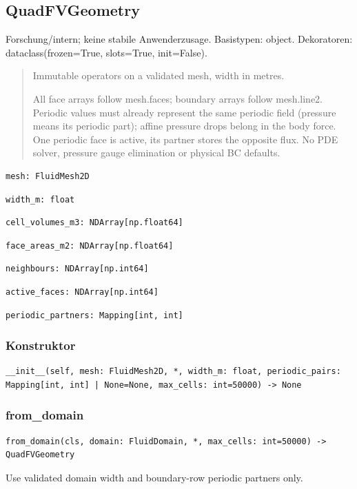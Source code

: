 \subsection{QuadFVGeometry}
Forschung/intern; keine stabile Anwenderzusage.
Basistypen: object. Dekoratoren: dataclass(frozen=True, slots=True, init=False).
\begin{quote}
Immutable operators on a validated mesh, width in metres.\par All face arrays follow mesh.faces; boundary arrays follow mesh.line2. Periodic values must already represent the same periodic field (pressure means its periodic part); affine pressure drops belong in the body force. One periodic face is active, its partner stores the opposite flux. No PDE solver, pressure gauge elimination or physical BC defaults.
\end{quote}
\begin{lstlisting}
mesh: FluidMesh2D
\end{lstlisting}
\begin{lstlisting}
width_m: float
\end{lstlisting}
\begin{lstlisting}
cell_volumes_m3: NDArray[np.float64]
\end{lstlisting}
\begin{lstlisting}
face_areas_m2: NDArray[np.float64]
\end{lstlisting}
\begin{lstlisting}
neighbours: NDArray[np.int64]
\end{lstlisting}
\begin{lstlisting}
active_faces: NDArray[np.int64]
\end{lstlisting}
\begin{lstlisting}
periodic_partners: Mapping[int, int]
\end{lstlisting}
\subsubsection*{Konstruktor}
\begin{lstlisting}
__init__(self, mesh: FluidMesh2D, *, width_m: float, periodic_pairs: Mapping[int, int] | None=None, max_cells: int=50000) -> None
\end{lstlisting}
\subsubsection*{from\_domain}
\begin{lstlisting}
from_domain(cls, domain: FluidDomain, *, max_cells: int=50000) -> QuadFVGeometry
\end{lstlisting}
Use validated domain width and boundary-row periodic partners only.
